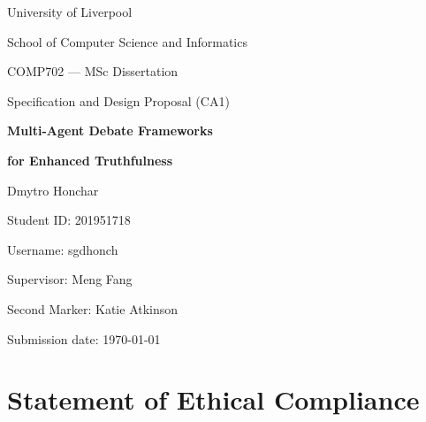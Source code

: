 \documentclass[12pt,a4paper]{article}
\begin{document}


\begin{titlepage}
\centering
\vspace*{2cm}

{\large University of Liverpool\par}
{\large School of Computer Science and Informatics\par}

\vspace{1.2cm}

{\normalsize COMP702 --- MSc Dissertation\par}
{\normalsize Specification and Design Proposal (CA1)\par}

\vspace{3cm}

{\LARGE\bfseries Multi-Agent Debate Frameworks\par}
\vspace{0.3cm}
{\LARGE\bfseries for Enhanced Truthfulness\par}

\vspace{3cm}

{\large Dmytro Honchar\par}
\vspace{0.2cm}
{Student ID: 201951718\par}
{Username: sgdhonch\par}

\vspace{1.2cm}

{\large Supervisor: Meng Fang\par}
{\large Second Marker: Katie Atkinson\par}

\vfill

{\large Submission date: \today\par}

\end{titlepage}


\section{Statement of Ethical Compliance}
\label{sec:ethical-compliance}
\end{document}
